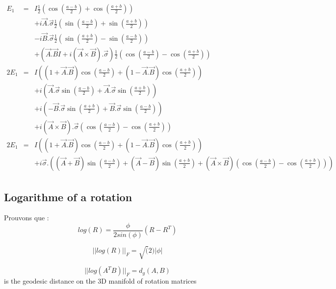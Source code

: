 \documentclass[12pt,a4paper]{article}
\begin{document}
\begin{eqnarray*}
	E_1&=& I \frac{1}{2}\left(\cos\left(\frac{a-b}{2}\right)+\cos\left(\frac{a+b}{2}\right)\right)\\
	&&+i \vec{A}.\vec{\sigma} \frac{1}{2}\left(\sin\left(\frac{a-b}{2}\right)+\sin\left(\frac{a+b}{2}\right)\right)\\
	&&-i  \vec{B}.\vec{\sigma} \frac{1}{2}\left(\sin\left(\frac{a+b}{2}\right)-\sin\left(\frac{a-b}{2}\right)\right)\\
	&&+ \left(\vec{A}.\vec{B} I + i(\vec{A}\times\vec{B}).\vec{\sigma}\right) \frac{1}{2}\left(\cos\left(\frac{a-b}{2}\right)-\cos\left(\frac{a+b}{2}\right)\right) \\
	2 E_1&=& I \left((1+\vec{A}.\vec{B})\cos\left(\frac{a-b}{2}\right)+(1-\vec{A}.\vec{B})\cos\left(\frac{a+b}{2}\right)\right)\\
	&&+i \left( \vec{A}.\vec{\sigma}\sin\left(\frac{a-b}{2}\right)+ \vec{A}.\vec{\sigma}\sin\left(\frac{a+b}{2}\right)\right)\\
	&&+i \left(  -\vec{B}.\vec{\sigma}\sin\left(\frac{a+b}{2}\right)+  \vec{B}.\vec{\sigma}\sin\left(\frac{a-b}{2}\right)\right)\\
	&&+i (\vec{A}\times\vec{B}).\vec{\sigma} \left(\cos\left(\frac{a-b}{2}\right)-\cos\left(\frac{a+b}{2}\right)\right) \\
	2 E_1&=& I \left((1+\vec{A}.\vec{B})\cos\left(\frac{a-b}{2}\right)+(1-\vec{A}.\vec{B})\cos\left(\frac{a+b}{2}\right)\right)\\
	&&+i \vec{\sigma}. \left( (\vec{A}+\vec{B})\sin\left(\frac{a-b}{2}\right)+ (\vec{A}-\vec{B})\sin\left(\frac{a+b}{2}\right)+(\vec{A}\times\vec{B}) \left(\cos\left(\frac{a-b}{2}\right)-\cos\left(\frac{a+b}{2}\right)\right)\right)\\
\end{eqnarray*}

\subsection{Logarithme of a rotation }

Prouvons que :
\[
log(R)=\frac{\phi}{2 sin(\phi)}(R-R^T)
\]

\[
||log(R)||_F=\sqrt(2)|\phi|
\]

\[
||log(A^TB)||_F=d_g(A,B)
\]
is the geodesic distance on the 3D manifold of rotation matrices
\end{document}
